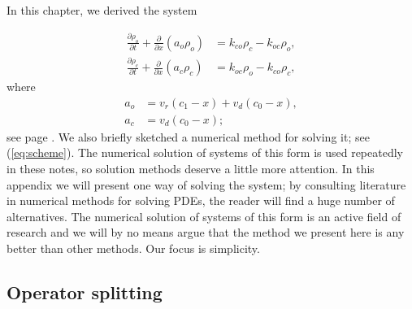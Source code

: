 In this chapter, we derived the system%

\begin{align}
\frac{\partial\rho_{o}}{\partial t}+\frac{\partial}{\partial x}\left(
a_{o}\rho_{o}\right)   &  =k_{co}\rho_{c}-k_{oc}\rho_{o},\label{pdf400}\\
\frac{\partial\rho_{c}}{\partial t}+\frac{\partial}{\partial x}\left(
a_{c}\rho_{c}\right)   &  =k_{oc}\rho_{o}-k_{co}\rho_{c},\nonumber
\end{align}
where
\begin{align}
a_{o} &  =v_{r}(c_{1}-x)+v_{d}(c_{0}-x),\label{pdf401}\\
a_{c} &  =v_{d}(c_{0}-x);\nonumber
\end{align}
see page \pageref{system_def_99}. We also briefly sketched a numerical method for solving
it; see (\ref{eq:scheme}). The numerical solution of systems of this form is used repeatedly in these notes, so solution methods deserve a little more
attention. In this appendix we will present one way of solving the system; by consulting literature in numerical methods for solving PDEs, the reader will find a huge number of alternatives. The numerical solution of systems of this form is an active field of research and we will by no means argue that the method we present here is any better than other methods.  Our focus is simplicity.

\subsection{Operator splitting}

